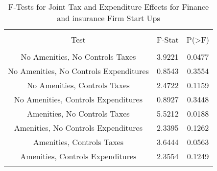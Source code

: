 
\begin{table}[!htbp] \centering 
  \caption{F-Tests for Joint Tax and Expenditure Effects for Finance and insurance Firm Start Ups} 
  \label{52Ftests} 
\begin{tabular}{@{\extracolsep{5pt}} ccc} 
\\[-1.8ex]\hline 
\hline \\[-1.8ex] 
Test & F-Stat & P(\textgreater F) \\ 
\hline \\[-1.8ex] 
No Amenities, No Controls Taxes & 3.9221 & 0.0477 \\ 
No Amenities, No Controls Expenditures & 0.8543 & 0.3554 \\ 
No Amenities, Controls Taxes & 2.4722 & 0.1159 \\ 
No Amenities, Controls Expenditures & 0.8927 & 0.3448 \\ 
Amenities, No Controls Taxes & 5.5212 & 0.0188 \\ 
Amenities, No Controls Expenditures & 2.3395 & 0.1262 \\ 
Amenities, Controls Taxes & 3.6444 & 0.0563 \\ 
Amenities, Controls Expenditures & 2.3554 & 0.1249 \\ 
\hline \\[-1.8ex] 
\end{tabular} 
\end{table} 
